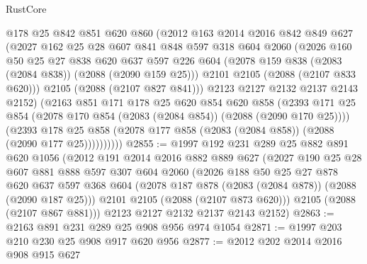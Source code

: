 \begin{lexlean}{RustCore}
\begin{coremodule}
              @178
              @25
              @842
              @851
              @620
              @860
              (@2012
                @163
                @2014
                @2016
                @842
                @849
                @627
                (@2027
                  @162
                  @25
                  @28
                  @607
                  @841
                  @848
                  @597
                  @318
                  @604
                  @2060
                  (@2026
                    @160
                    @50
                    @25
                    @27
                    @838
                    @620
                    @637
                    @597
                    @226
                    @604
                    (@2078 @159 @838 (@2083 (@2084 @838)) (@2088 (@2090 @159 @25)))
                    @2101
                    @2105
                    (@2088 (@2107 @833 @620)))
                  @2105
                  (@2088 (@2107 @827 @841)))
                @2123
                @2127
                @2132
                @2137
                @2143
                @2152)
              (@2163
                @851
                @171
                @178
                @25
                @620
                @854
                @620
                @858
                (@2393
                  @171
                  @25
                  @854
                  (@2078 @170 @854 (@2083 (@2084 @854)) (@2088 (@2090 @170 @25))))
                (@2393
                  @178
                  @25
                  @858
                  (@2078 @177 @858 (@2083 (@2084 @858)) (@2088 (@2090 @177 @25))))))))))
@2855 := @1997
    @192
    @231
    @289
    @25
    @882
    @891
    @620
    @1056
    (@2012
      @191
      @2014
      @2016
      @882
      @889
      @627
      (@2027
        @190
        @25
        @28
        @607
        @881
        @888
        @597
        @307
        @604
        @2060
        (@2026
          @188
          @50
          @25
          @27
          @878
          @620
          @637
          @597
          @368
          @604
          (@2078 @187 @878 (@2083 (@2084 @878)) (@2088 (@2090 @187 @25)))
          @2101
          @2105
          (@2088 (@2107 @873 @620)))
        @2105
        (@2088 (@2107 @867 @881)))
      @2123
      @2127
      @2132
      @2137
      @2143
      @2152)
@2863 := @2163 @891 @231 @289 @25 @908 @956 @974 @1054
@2871 := @1997 @203 @210 @230 @25 @908 @917 @620 @956
@2877 := @2012 @202 @2014 @2016 @908 @915 @627

\end{coremodule}
\end{lexlean}
